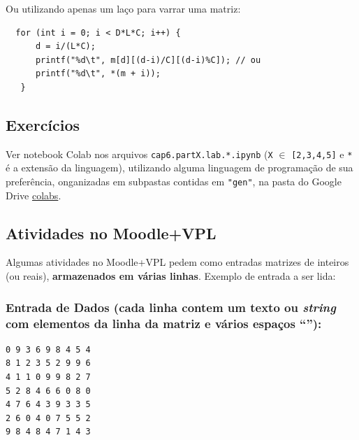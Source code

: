 \documentclass[12pt,a4paper]{article}
\begin{document}
Ou utilizando apenas um laço para varrar uma matriz:

\begin{verbatim}
  for (int i = 0; i < D*L*C; i++) {
      d = i/(L*C);
      printf("%d\t", m[d][(d-i)/C][(d-i)%C]); // ou
      printf("%d\t", *(m + i));
   }
\end{verbatim}

    \hypertarget{exercuxedcios}{%
\subsection{Exercícios}\label{exercuxedcios}}

    Ver notebook Colab nos arquivos \texttt{cap6.partX.lab.*.ipynb}
(\texttt{X} \(\in\) \texttt{{[}2,3,4,5{]}} e \texttt{*} é a extensão da
linguagem), utilizando alguma linguagem de programação de sua
preferência, onganizadas em subpastas contidas em \texttt{"gen"}, na
pasta do Google Drive
\href{https://drive.google.com/drive/folders/1YlFwv8XYN7PYYf-HwDMlkxzbmXzJw9cM?usp=sharing}{colabs}.

    \hypertarget{atividades-no-moodlevpl}{%
\subsection{Atividades no Moodle+VPL}\label{atividades-no-moodlevpl}}

Algumas atividades no Moodle+VPL pedem como entradas matrizes de
inteiros (ou reais), \textbf{armazenados em várias linhas}. Exemplo de
entrada a ser lida:

\hypertarget{entrada-de-dados-cada-linha-contem-um-texto-ou-string-com-elementos-da-linha-da-matriz-e-vuxe1rios-espauxe7os}{%
\subsubsection{\texorpdfstring{Entrada de Dados (cada linha contem um
texto ou \emph{string} com elementos da linha da matriz e vários espaços
``\texttt{}''):}{Entrada de Dados (cada linha contem um texto ou string com elementos da linha da matriz e vários espaços ``\,''):}}\label{entrada-de-dados-cada-linha-contem-um-texto-ou-string-com-elementos-da-linha-da-matriz-e-vuxe1rios-espauxe7os}}

\begin{verbatim}
0 9 3 6 9 8 4 5 4
8 1 2 3 5 2 9 9 6
4 1 1 0 9 9 8 2 7
5 2 8 4 6 6 0 8 0
4 7 6 4 3 9 3 3 5
2 6 0 4 0 7 5 5 2
9 8 4 8 4 7 1 4 3
\end{verbatim}
\end{document}
